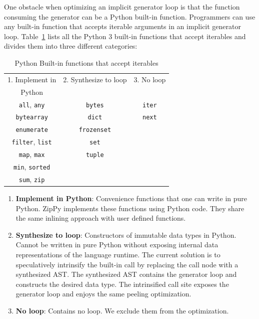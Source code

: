One obstacle when optimizing an implicit generator loop is that the function consuming the generator can be a Python built-in function.
Programmers can use any built-in function that accepts iterable arguments in an implicit generator loop.
Table~\ref{tab:ch4-builtins} lists all the Python 3 built-in functions that accept iterables and divides them into three different categories:

\begin{table}[!ht]
  \begin{center}
    \begin{tabular}{ c c c }
      \toprule
      1. Implement in                & 2. Synthesize to loop & 3. No loop \\
      Python                         &                       & \\
      \midrule
      \texttt{all}, \texttt{any}     & \texttt{bytes}        & \texttt{iter} \\
      \texttt{bytearray}             & \texttt{dict}         & \texttt{next} \\
      \texttt{enumerate}             & \texttt{frozenset}    &               \\
      \texttt{filter}, \texttt{list} & \texttt{set}          &               \\
      \texttt{map}, \texttt{max}     & \texttt{tuple}        &               \\
      \texttt{min}, \texttt{sorted}  &                       &               \\
      \texttt{sum}, \texttt{zip}     &                       &               \\
      \bottomrule
    \end{tabular}
    \caption{Python Built-in functions that accept iterables}
    \label{tab:ch4-builtins}
  \end{center}
\end{table}

\begin{enumerate}

\item \textbf{Implement in Python}:
Convenience functions that one can write in pure Python.
ZipPy implements these functions using Python code.
They share the same inlining approach with user defined functions.

\item \textbf{Synthesize to loop}:
Constructors of immutable data types in Python.
Cannot be written in pure Python without exposing internal data representations of the language runtime.
The current solution is to speculatively intrinsify the built-in call by replacing the call node with a synthesized AST.
The synthesized AST contains the generator loop and constructs the desired data type.
The intrinsified call site exposes the generator loop and enjoys the same peeling optimization.

\item \textbf{No loop}:
Contains no loop.
We exclude them from the optimization.

\end{enumerate}

